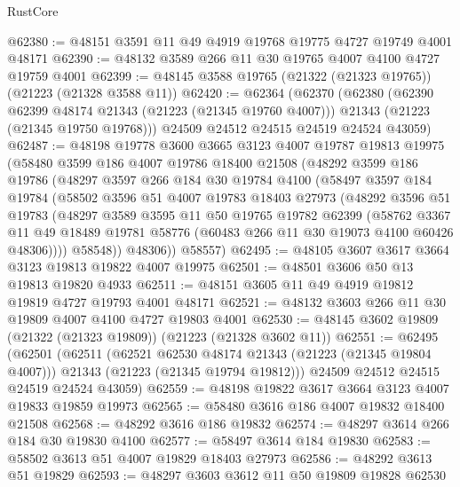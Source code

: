 \begin{lexlean}{RustCore}
\begin{coremodule}
@62380 := @48151 @3591 @11 @49 @4919 @19768 @19775 @4727 @19749 @4001 @48171
@62390 := @48132 @3589 @266 @11 @30 @19765 @4007 @4100 @4727 @19759 @4001
@62399 := @48145 @3588 @19765 (@21322 (@21323 @19765)) (@21223 (@21328 @3588 @11))
@62420 := @62364
    (@62370
      (@62380
        (@62390 @62399 @48174 @21343 (@21223 (@21345 @19760 @4007)))
        @21343
        (@21223 (@21345 @19750 @19768)))
      @24509
      @24512
      @24515
      @24519
      @24524
      @43059)
@62487 := @48198
    @19778
    @3600
    @3665
    @3123
    @4007
    @19787
    @19813
    @19975
    (@58480
      @3599
      @186
      @4007
      @19786
      @18400
      @21508
      (@48292
        @3599
        @186
        @19786
        (@48297
          @3597
          @266
          @184
          @30
          @19784
          @4100
          (@58497
            @3597
            @184
            @19784
            (@58502
              @3596
              @51
              @4007
              @19783
              @18403
              @27973
              (@48292
                @3596
                @51
                @19783
                (@48297
                  @3589
                  @3595
                  @11
                  @50
                  @19765
                  @19782
                  @62399
                  (@58762
                    @3367
                    @11
                    @49
                    @18489
                    @19781
                    @58776
                    (@60483 @266 @11 @30 @19073 @4100 @60426 @48306))))
              @58548))
          @48306))
      @58557)
@62495 := @48105 @3607 @3617 @3664 @3123 @19813 @19822 @4007 @19975
@62501 := @48501 @3606 @50 @13 @19813 @19820 @4933
@62511 := @48151 @3605 @11 @49 @4919 @19812 @19819 @4727 @19793 @4001 @48171
@62521 := @48132 @3603 @266 @11 @30 @19809 @4007 @4100 @4727 @19803 @4001
@62530 := @48145 @3602 @19809 (@21322 (@21323 @19809)) (@21223 (@21328 @3602 @11))
@62551 := @62495
    (@62501
      (@62511
        (@62521 @62530 @48174 @21343 (@21223 (@21345 @19804 @4007)))
        @21343
        (@21223 (@21345 @19794 @19812)))
      @24509
      @24512
      @24515
      @24519
      @24524
      @43059)
@62559 := @48198 @19822 @3617 @3664 @3123 @4007 @19833 @19859 @19973
@62565 := @58480 @3616 @186 @4007 @19832 @18400 @21508
@62568 := @48292 @3616 @186 @19832
@62574 := @48297 @3614 @266 @184 @30 @19830 @4100
@62577 := @58497 @3614 @184 @19830
@62583 := @58502 @3613 @51 @4007 @19829 @18403 @27973
@62586 := @48292 @3613 @51 @19829
@62593 := @48297 @3603 @3612 @11 @50 @19809 @19828 @62530

\end{coremodule}
\end{lexlean}
